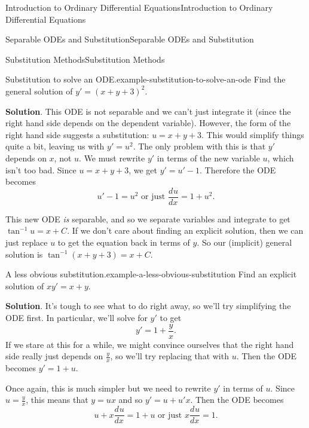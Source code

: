\documentclass[10pt,]{book}
\numberwithin{equation}{section}
\newcommand{\dv}[3][]{\dfrac{d^{#1} #2}{d #3^{#1}}}
\begin{document}
\begin{chapterptx}{Introduction to Ordinary Differential Equations}{}{Introduction to Ordinary Differential Equations}{}{}
\begin{sectionptx}{Separable ODEs and Substitution}{}{Separable ODEs and Substitution}{}{}
\begin{subsectionptx}{Substitution Methods}{}{Substitution Methods}{}{}
\begin{example}{Substitution to solve an ODE.}{example-substitution-to-solve-an-ode}%
\hypertarget{p-63}{}%
Find the general solution of \(y' = (x+y+3)^{2}\).%
\par\smallskip%
\noindent\textbf{Solution}.\hypertarget{solution-11}{}\quad%
\hypertarget{p-64}{}%
This ODE is not separable and we can't just integrate it (since the right hand side depends on the dependent variable). However, the form of the right hand side suggests a substitution: \(u = x+y+3\). This would simplify things quite a bit, leaving us with \(y'=u^{2}\). The only problem with this is that \(y'\) depends on \(x\), not \(u\). We must rewrite \(y'\) in terms of the new variable \(u\), which isn't too bad. Since \(u = x+y+3\), we get \(y' = u'-1\). Therefore the ODE becomes%
\begin{equation*}
u'-1 = u^{2}\text{ or just }\dv{u}{x} = 1+u^{2}.
\end{equation*}
%
\par
\hypertarget{p-65}{}%
This new ODE \emph{is} separable, and so we separate variables and integrate to get \(\tan^{-1}u = x+C\). If we don't care about finding an explicit solution, then we can just replace \(u\) to get the equation back in terms of \(y\). So our (implicit) general solution is \(\tan^{-1}(x+y+3) = x+C\).%
\end{example}
\begin{example}{A less obvious substitution.}{example-a-less-obvious-substitution}%
\hypertarget{p-66}{}%
Find an explicit solution of \(xy'=x+y\).%
\par\smallskip%
\noindent\textbf{Solution}.\hypertarget{solution-12}{}\quad%
\hypertarget{p-67}{}%
It's tough to see what to do right away, so we'll try simplifying the ODE first. In particular, we'll solve for \(y'\) to get%
\begin{equation*}
y' = 1+\frac{y}{x}.
\end{equation*}
If we stare at this for a while, we might convince ourselves that the right hand side really just depends on \(\frac{y}{x}\), so we'll try replacing that with \(u\). Then the ODE becomes \(y'=1+u\).%
\par
\hypertarget{p-68}{}%
Once again, this is much simpler but we need to rewrite \(y'\) in terms of \(u\). Since \(u=\frac{y}{x}\), this means that \(y=ux\) and so \(y' = u+u'x\). Then the ODE becomes%
\begin{equation*}
u+x\dv{u}{x} = 1+u\text{ or just } x\dv{u}{x} = 1\text{.}
\end{equation*}

\end{example}
\end{subsectionptx}
\end{sectionptx}
\end{chapterptx}
\end{document}
